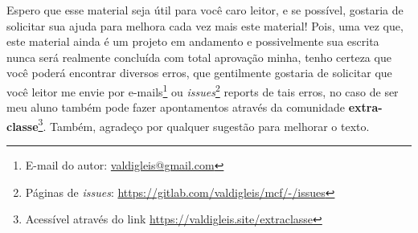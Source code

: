 Espero que esse material seja útil para você caro leitor, e se possível, gostaria de solicitar sua ajuda para melhora cada vez mais este material! Pois, uma vez que, este material ainda é um projeto em andamento e possivelmente sua escrita nunca será realmente concluída com total aprovação minha, tenho certeza que você poderá encontrar diversos erros, que gentilmente gostaria de solicitar que você leitor me envie por e-mails\footnote{E-mail do autor: \url{valdigleis@gmail.com}} ou \textit{issues}\footnote{Páginas de \textit{issues}: \url{https://gitlab.com/valdigleis/mcf/-/issues}} reports de tais erros, no caso de ser meu aluno também pode fazer apontamentos através da comunidade \textbf{extra-classe}\footnote{Acessível através do link \url{https://valdigleis.site/extraclasse}}. Também, agradeço por qualquer sugestão para melhorar o texto.



\endgroup
\newpage
